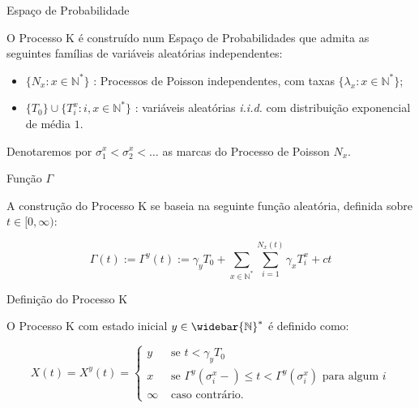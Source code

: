 \documentclass[xcolor=pdftex,dvipsnames]{beamer}
\newcommand{\Nz}{{\mathbb{N^*}}}
\newcommand{\Nzb}{{\mathbb{\widebar{N}^*}}}
\begin{document}
\begin{frame}{Espaço de Probabilidade}

  O Processo K é construído num Espaço de Probabilidades que admita as
  seguintes famílias de variáveis aleatórias independentes:

  \begin{itemize}
  \item $\{ N_x: x \in \Nz\}$ : Processos de Poisson independentes,
    com taxas $\{ \lambda_x : x \in \Nz \}$;
  \item $\{T_0\} \cup \{ T_i^x: i, x \in \Nz  \}$ : variáveis aleatórias
    \emph{i.i.d.} com distribuição exponencial de média $1$.
  \end{itemize}

  Denotaremos por $\sigma^x_1 < \sigma^x_2 < \ldots$ as marcas do
  Processo de Poisson $N_x$.
  
\end{frame}

\begin{frame}{Função $\Gamma$}

  A construção do Processo K se baseia na seguinte função aleatória,
  definida sobre $t \in [0, \infty)$:

  \begin{displaymath}
    \Gamma(t) := \Gamma^y(t) := \gamma_y T_0 + \sum_{x \in \Nz} \sum_{i = 1}^{N_x (t)}
    \gamma_x T^x_i + c t
  \end{displaymath}
\end{frame}

\begin{frame}{Definição do Processo K}
  
  O Processo K com estado inicial $y \in \Nzb$ é definido como:

  \begin{displaymath}
    X(t) = X^y (t) =
    \begin{cases}
      y & \textrm{ se }  t < \gamma_y T_0\\
      x & \textrm{ se } \Gamma^y(\sigma_i^x-) \leq t <
      \Gamma^y(\sigma^x_i)
      \textrm{ para algum } i \\
      \infty & \textrm{ caso contrário.}
    \end{cases}
  \end{displaymath}
\end{frame}
\end{document}
